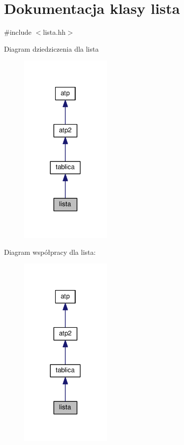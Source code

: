 \hypertarget{classlista}{}\section{Dokumentacja klasy lista}
\label{classlista}


{\ttfamily \#include $<$lista.\+hh$>$}



Diagram dziedziczenia dla lista\nopagebreak
\begin{figure}[H]
\begin{center}
\leavevmode
\includegraphics[width=125pt]{classlista__inherit__graph}
\end{center}
\end{figure}


Diagram współpracy dla lista\+:\nopagebreak
\begin{figure}[H]
\begin{center}
\leavevmode
\includegraphics[width=125pt]{classlista__coll__graph}
\end{center}
\end{figure}
